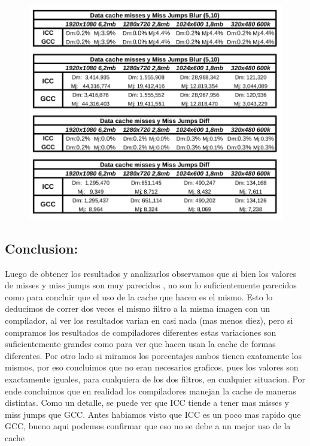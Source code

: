\begin{figure}[H]
\begin{center}
  \includegraphics[width=\linewidth]{cachecompiladores/tabla.png}
\end{center}
\end{figure}

\subsection{Conclusion:}

Luego de obtener los resultados y analizarlos observamos que si bien los valores de misses y miss jumps son muy parecidos , no son lo suficientemente parecidos como para concluir que el uso de la cache que hacen es el mismo. Esto lo deducimos de correr dos veces el mismo filtro a la misma imagen con un compilador, al ver los resultados varian en  casi nada (mas menos diez), pero si compramos los resultados de compiladores diferentes estas variaciones son suficientemente grandes como para ver que hacen usan la cache de formas diferentes. Por otro lado si miramos los porcentajes ambos tienen exatamente los mismos, por eso concluimos que no eran necesarios graficos, pues los valores son exactamente iguales, para cualquiera de los dos filtros, en cualquier situacion. Por ende concluimos que en realidad los compiladores manejan la cache de maneras distintas. Como un detalle, se puede ver que ICC tiende a tener mas misses y miss jumps que GCC. Antes habiamos visto que ICC es un poco mas rapido que GCC, bueno aqui podemos confirmar que eso no se debe a un mejor uso de la cache